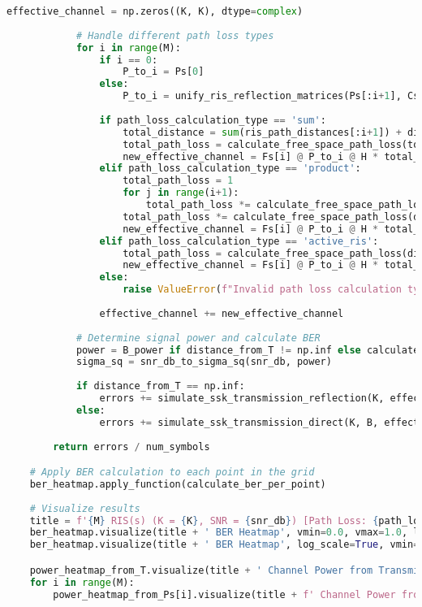 \begin{lstlisting}[language=python, caption={BER Heatmap Simulation}]
            effective_channel = np.zeros((K, K), dtype=complex)
            
            # Handle different path loss types
            for i in range(M):
                if i == 0:
                    P_to_i = Ps[0]
                else:
                    P_to_i = unify_ris_reflection_matrices(Ps[:i+1], Cs[:i])
                
                if path_loss_calculation_type == 'sum':
                    total_distance = sum(ris_path_distances[:i+1]) + distances_from_Ps_current[i]
                    total_path_loss = calculate_free_space_path_loss(total_distance)
                    new_effective_channel = Fs[i] @ P_to_i @ H * total_path_loss
                elif path_loss_calculation_type == 'product':
                    total_path_loss = 1
                    for j in range(i+1):
                        total_path_loss *= calculate_free_space_path_loss(ris_path_distances[j])
                    total_path_loss *= calculate_free_space_path_loss(distances_from_Ps_current[i])
                    new_effective_channel = Fs[i] @ P_to_i @ H * total_path_loss
                elif path_loss_calculation_type == 'active_ris':
                    total_path_loss = calculate_free_space_path_loss(distances_from_Ps_current[i])
                    new_effective_channel = Fs[i] @ P_to_i @ H * total_path_loss 
                else: 
                    raise ValueError(f"Invalid path loss calculation type: {path_loss_calculation_type}")   
                
                effective_channel += new_effective_channel
            
            # Determine signal power and calculate BER
            power = B_power if distance_from_T != np.inf else calculate_channel_power(effective_channel) 
            sigma_sq = snr_db_to_sigma_sq(snr_db, power)
            
            if distance_from_T == np.inf:
                errors += simulate_ssk_transmission_reflection(K, effective_channel, sigma_sq)
            else:
                errors += simulate_ssk_transmission_direct(K, B, effective_channel, sigma_sq)
                
        return errors / num_symbols

    # Apply BER calculation to each point in the grid
    ber_heatmap.apply_function(calculate_ber_per_point)
    
    # Visualize results
    title = f'{M} RIS(s) (K = {K}, SNR = {snr_db}) [Path Loss: {path_loss_calculation_type}]'
    ber_heatmap.visualize(title + ' BER Heatmap', vmin=0.0, vmax=1.0, label='BER', show_receivers_values=True)
    ber_heatmap.visualize(title + ' BER Heatmap', log_scale=True, vmin=-10.0, vmax=0.0, label='BER', show_receivers_values=True)

    power_heatmap_from_T.visualize(title + ' Channel Power from Transmitter', log_scale=True, vmin=-10.0, vmax=0.0, label='Power (dB)')
    for i in range(M):
        power_heatmap_from_Ps[i].visualize(title + f' Channel Power from RIS {i+1}', log_scale=True, vmin=-10.0, vmax=0.0, label='Power (dB)')
\end{lstlisting}

